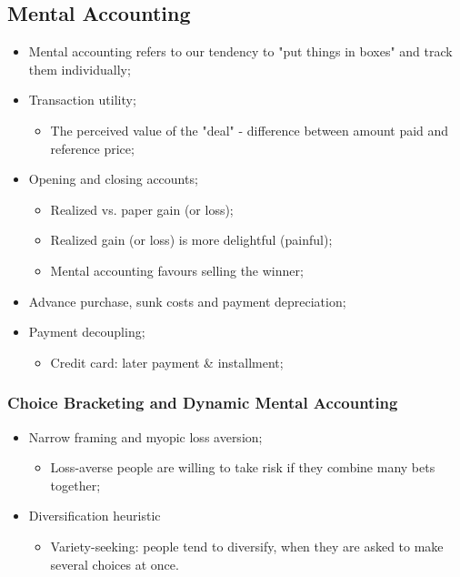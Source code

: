 \documentclass[11pt,a4paper]{report}
\begin{document}
    \subsection{Mental Accounting}
    \begin{itemize}
        \item Mental accounting refers to our tendency to "put things in boxes" and track them individually;
        \item Transaction utility;
        \begin{itemize}
            \item The perceived value of the "deal" - difference between amount paid and reference price;
        \end{itemize}
        \item Opening and closing accounts;
        \begin{itemize}
            \item Realized vs. paper gain (or loss);
            \item Realized gain (or loss) is more delightful (painful);
            \item Mental accounting favours selling the winner;
        \end{itemize}
        \item Advance purchase, sunk costs and payment depreciation;
        \item Payment decoupling;
        \begin{itemize}
            \item Credit card: later payment \& installment;
        \end{itemize}
    \end{itemize}
    \subsubsection{Choice Bracketing and Dynamic Mental Accounting}
    \begin{itemize}
        \item Narrow framing and myopic loss aversion;
        \begin{itemize}
            \item Loss-averse people are willing to take risk if they combine many bets together;
        \end{itemize}
        \item Diversification heuristic
        \begin{itemize}
            \item Variety-seeking: people tend to diversify, when they are asked to make several choices at once.
        \end{itemize}
    \end{itemize}
\end{document}
